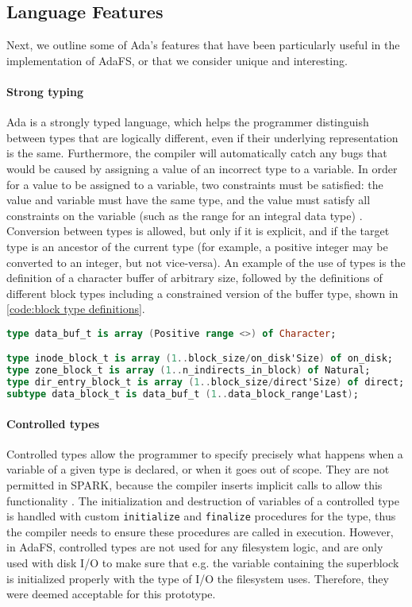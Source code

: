 \subsection{Language Features}
Next, we outline some of Ada's features that have been particularly useful in the implementation of AdaFS, or that we consider unique and interesting.

\paragraph{Strong typing}
Ada is a strongly typed language, which helps the programmer distinguish between types that are logically different, even if their underlying representation is the same.
Furthermore, the compiler will automatically catch any bugs that would be caused by assigning a value of an incorrect type to a variable.
In order for a value to be assigned to a variable, two constraints must be satisfied: the value and variable must have the same type, and the value must satisfy all constraints on the variable (such as the range for an integral data type) \cite{barnes2014}.
Conversion between types is allowed, but only if it is explicit, and if the target type is an ancestor of the current type (for example, a positive integer may be converted to an integer, but not vice-versa).
An example of the use of types is the definition of a character buffer of arbitrary size, followed by the definitions of different block types including a constrained version of the buffer type, shown in \autoref{code:block type definitions}.

\begin{lstlisting}[float=tb,caption={Block type definitions.}, label={code:block type definitions}, language=Ada]
type data_buf_t is array (Positive range <>) of Character;

type inode_block_t is array (1..block_size/on_disk'Size) of on_disk;
type zone_block_t is array (1..n_indirects_in_block) of Natural;
type dir_entry_block_t is array (1..block_size/direct'Size) of direct;
subtype data_block_t is data_buf_t (1..data_block_range'Last);
\end{lstlisting}

\paragraph{Controlled types}
Controlled types allow the programmer to specify precisely what happens when a variable of a given type is declared, or when it goes out of scope.
They are not permitted in SPARK, because the compiler inserts implicit calls to allow this functionality \cite{sparkRM}.
The initialization and destruction of variables of a controlled type is handled with custom \lstinline[language=Ada]{initialize} and \lstinline[language=Ada]{finalize} procedures for the type, thus the compiler needs to ensure these procedures are called in execution.
However, in AdaFS, controlled types are not used for any filesystem logic, and are only used with disk I/O to make sure that e.g. the variable containing the superblock is initialized properly with the type of I/O the filesystem uses.
Therefore, they were deemed acceptable for this prototype.

